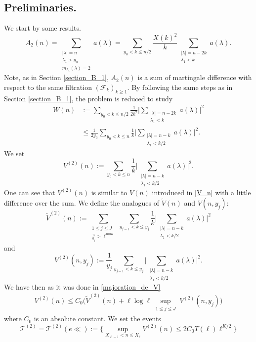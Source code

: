 \documentclass{article}
\begin{document}
\subsection{Preliminaries.}
We start by some results.
$$
A_2(n)= \sum_{\substack{|\lambda|=n \\ \lambda_1 > y_0 \\ m_{\lambda_1}(\lambda)=2}} a(\lambda) = \sum_{ y_0 <k \leqslant n/2} \frac{X(k)^2}{k} \sum_{\substack{|\lambda|=n-2k \\ \lambda_1 <  k }} a(\lambda).
$$ 
Note, as in Section \ref{section_B_1}, $A_2(n)$ is a sum of martingale difference with respect to the same filtration $(\mathcal{F}_{k})_{k\geqslant 1}$. By following the same steps as in Section \ref{section_B_1}, the problem is reduced to study 
\begin{align*}
    W(n) &:= \sum_{ y_0 <k \leqslant n/2} \frac{1}{2k^2}\bigg| \sum_{\substack{|\lambda|=n-2k \\ \lambda_1 <  k }} a(\lambda) \bigg|^2
    \\ & \leqslant \frac{1}{2y_0} \sum_{ y_0 <k \leqslant n} \frac{1}{k}\bigg| \sum_{\substack{|\lambda|=n-k \\ \lambda_1 <  k/2 }} a(\lambda) \bigg|^2.
\end{align*}
We set
$$
V^{(2)}(n):= \sum_{ y_0 <k \leqslant n} \frac{1}{k}\bigg| \sum_{\substack{|\lambda|=n-k \\ \lambda_1 <  k/2 }} a(\lambda) \bigg|^2.
$$
One can see that $V^{(2)}(n)$ is similar to $V(n)$ introduced in \eqref{V_n} with a little difference over the sum. We define the analogues of $\widetilde{V}(n)$  and $V(n,y_j)$: 
$$
\widetilde{V}^{(2)}(n):= \sum_{\substack{ 1 \leqslant j\leqslant J \\ \frac{n}{y_{j}} >\ell^{100K}}}\sum_{ y_{j-1} <k \leqslant y_j}  \frac{1}{k}\bigg| \sum_{\substack{|\lambda|=n-k \\ \lambda_1 <  k/2 }} a(\lambda) \bigg|^2
$$
and
$$
V^{(2)}(n,y_{j}):= \frac{1}{y_{j}}\sum_{ y_{j-1} <k \leqslant y_j} \bigg| \sum_{\substack{|\lambda|=n-k \\ \lambda_1 <  k/2 }} a(\lambda) \bigg|^2.
$$
We have then as it was done in \eqref{majoration_de_V}
$$
\begin{aligned}
    V^{(2)}(n)  \leqslant C_0\bigg(  \widetilde{V}^{(2)}(n)+ \ell \log \ell \sup_{\substack{ 1\leqslant j\leqslant J}}  V^{(2)}(n,y_{j}) \bigg)
\end{aligned}
$$
where $C_0$ is an absolute constant. We set the events
\begin{equation}\label{event_T_2}
    \mathcal{T}^{(2)}= \mathcal{T}^{(2)}(e\ll):= \bigg\{ \sup_{ X_{\ell-1}<n \leqslant X_{\ell}}  V^{(2)}(n) \leqslant 2C_0T(\ell)\ell^{K/2} \bigg\}
\end{equation}
\end{document}

